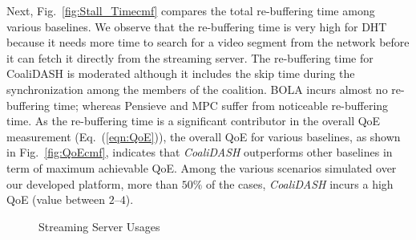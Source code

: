 Next, Fig.~\ref{fig:Stall_Timecmf} compares the total re-buffering time among various baselines. We observe that the re-buffering time is very high for DHT because it needs more time to search for a video segment from the network before it can fetch it directly from the streaming server. The re-buffering time for CoaliDASH is moderated although it includes the skip time during the synchronization among the members of the coalition. BOLA incurs almost no re-buffering time; whereas Pensieve and MPC suffer from noticeable re-buffering time. As the re-buffering time is a significant contributor in the overall QoE measurement (Eq.~(\ref{eqn:QoE})), the overall QoE for various baselines, as shown in Fig.~\ref{fig:QoEcmf}, indicates that \textit{CoaliDASH} outperforms other baselines in term of maximum achievable QoE.  Among the various scenarios simulated over our developed platform, more than $50\%$ of the cases, \textit{CoaliDASH} incurs a high QoE (value between $2$--$4$). 

\begin{figure}[!ht]
	\captionsetup[subfigure]{}
	\begin{center}
	\end{center}
	\caption{\label{fig:cdnuploaded}Streaming Server Usages}
\end{figure}

